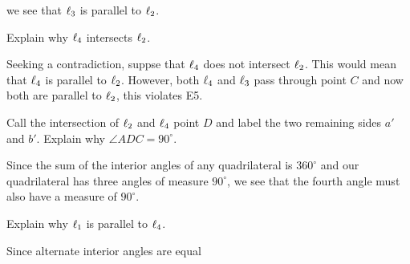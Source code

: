 \documentclass[newpage,hints,handout]{ximera}
\begin{document}
\begin{problem}
\begin{freeResponse}
\begin{image}
\end{image}
we see that $\ell_3$ is parallel to $\ell_2$. 
\end{freeResponse}


Explain why $\ell_4$ intersects $\ell_2$.

\begin{freeResponse}
  Seeking a contradiction, suppse that $\ell_4$ does not intersect
  $\ell_2$. This would mean that $\ell_4$ is parallel to $\ell_2$. However,
  both $\ell_4$ and $\ell_3$ pass through point $C$ and now both are
  parallel to $\ell_2$, this violates E5.
\end{freeResponse}


Call the intersection of $\ell_2$ and $\ell_4$ point $D$ and label the two
remaining sides $a'$ and $b'$. Explain why $\angle ADC = 90^\circ$.

\begin{freeResponse}
Since the sum of the interior angles of any quadrilateral is
$360^\circ$ and our quadrilateral has three angles of measure
$90^\circ$, we see that the fourth angle must also have a measure of
$90^\circ$.
\end{freeResponse}



Explain why $\ell_1$ is parallel to $\ell_4$.

\begin{freeResponse}
Since alternate interior angles are equal
\begin{image}
\end{image}
\end{freeResponse}
\end{problem}
\end{document}
